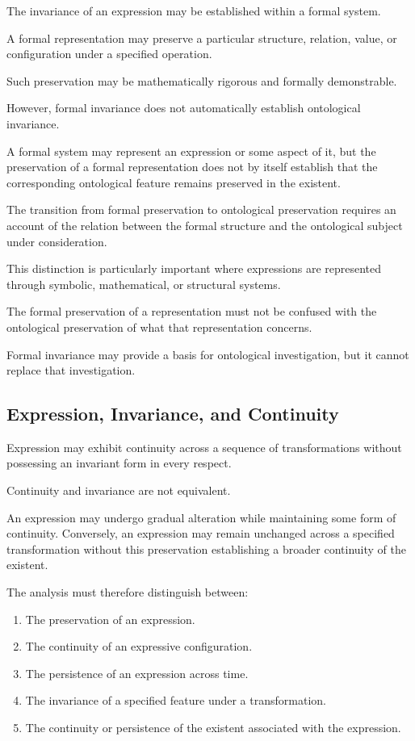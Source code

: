 The invariance of an expression may be established
within a formal system.

A formal representation may preserve a particular
structure, relation, value, or configuration
under a specified operation.

Such preservation may be mathematically rigorous
and formally demonstrable.

However, formal invariance does not automatically
establish ontological invariance.

A formal system may represent an expression or
some aspect of it, but the preservation of a
formal representation does not by itself establish
that the corresponding ontological feature remains
preserved in the existent.

The transition from formal preservation to
ontological preservation requires an account
of the relation between the formal structure
and the ontological subject under consideration.

This distinction is particularly important where
expressions are represented through symbolic,
mathematical, or structural systems.

The formal preservation of a representation
must not be confused with the ontological
preservation of what that representation concerns.

Formal invariance may provide a basis for
ontological investigation, but it cannot replace
that investigation.

\subsection{Expression, Invariance, and Continuity}

Expression may exhibit continuity across a
sequence of transformations without possessing
an invariant form in every respect.

Continuity and invariance are not equivalent.

An expression may undergo gradual alteration
while maintaining some form of continuity.
Conversely, an expression may remain unchanged
across a specified transformation without this
preservation establishing a broader continuity
of the existent.

The analysis must therefore distinguish between:

\begin{enumerate}
    \item The preservation of an expression.
    \item The continuity of an expressive configuration.
    \item The persistence of an expression across time.
    \item The invariance of a specified feature under
    a transformation.
    \item The continuity or persistence of the existent
    associated with the expression.
\end{enumerate}


